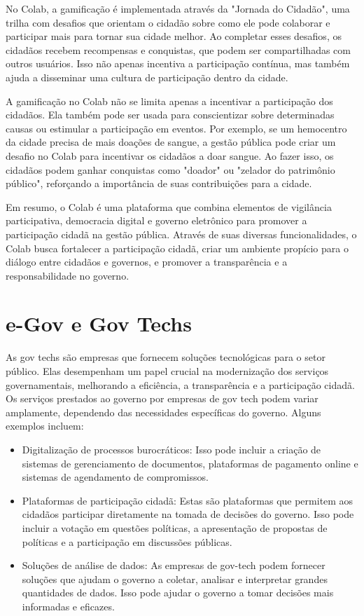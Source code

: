 No Colab, a gamificação é implementada através da "Jornada do Cidadão", uma trilha com desafios que orientam o cidadão sobre como ele pode colaborar e participar mais para tornar sua cidade melhor. Ao completar esses desafios, os cidadãos recebem recompensas e conquistas, que podem ser compartilhadas com outros usuários. Isso não apenas incentiva a participação contínua, mas também ajuda a disseminar uma cultura de participação dentro da cidade.

A gamificação no Colab não se limita apenas a incentivar a participação dos cidadãos. Ela também pode ser usada para conscientizar sobre determinadas causas ou estimular a participação em eventos. Por exemplo, se um hemocentro da cidade precisa de mais doações de sangue, a gestão pública pode criar um desafio no Colab para incentivar os cidadãos a doar sangue. Ao fazer isso, os cidadãos podem ganhar conquistas como "doador" ou "zelador do patrimônio público", reforçando a importância de suas contribuições para a cidade.

Em resumo, o Colab é uma plataforma que combina elementos de vigilância participativa, democracia digital e governo eletrônico para promover a participação cidadã na gestão pública. Através de suas diversas funcionalidades, o Colab busca fortalecer a participação cidadã, criar um ambiente propício para o diálogo entre cidadãos e governos, e promover a transparência e a responsabilidade no governo.

\section*{e-Gov e Gov Techs}
As gov techs são empresas que fornecem soluções tecnológicas para o setor público. Elas desempenham um papel crucial na modernização dos serviços governamentais, melhorando a eficiência, a transparência e a participação cidadã. Os serviços prestados ao governo por empresas de gov tech podem variar amplamente, dependendo das necessidades específicas do governo. Alguns exemplos incluem:

\begin{itemize}
	\item Digitalização de processos burocráticos: Isso pode incluir a criação de sistemas de gerenciamento de documentos, plataformas de pagamento online e sistemas de agendamento de compromissos.
	\item Plataformas de participação cidadã: Estas são plataformas que permitem aos cidadãos participar diretamente na tomada de decisões do governo. Isso pode incluir a votação em questões políticas, a apresentação de propostas de políticas e a participação em discussões públicas.
	\item Soluções de análise de dados: As empresas de gov-tech podem fornecer soluções que ajudam o governo a coletar, analisar e interpretar grandes quantidades de dados. Isso pode ajudar o governo a tomar decisões mais informadas e eficazes.
\end{itemize}


